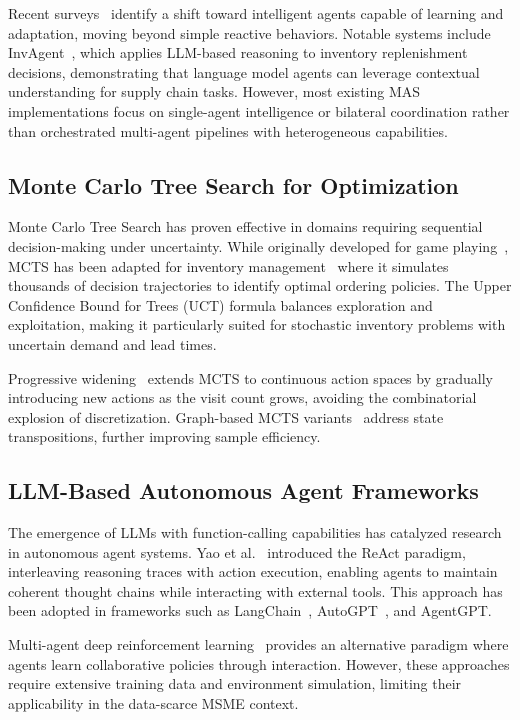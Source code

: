 \documentclass[conference]{IEEEtran}
\begin{document}
Recent surveys~\cite{mas_evolution} identify a shift toward intelligent agents capable of learning and adaptation, moving beyond simple reactive behaviors. Notable systems include InvAgent~\cite{invagent2024}, which applies LLM-based reasoning to inventory replenishment decisions, demonstrating that language model agents can leverage contextual understanding for supply chain tasks. However, most existing MAS implementations focus on single-agent intelligence or bilateral coordination rather than orchestrated multi-agent pipelines with heterogeneous capabilities.

\subsection{Monte Carlo Tree Search for Optimization}

Monte Carlo Tree Search has proven effective in domains requiring sequential decision-making under uncertainty. While originally developed for game playing~\cite{mcts_survey}, MCTS has been adapted for inventory management~\cite{mcts_inventory} where it simulates thousands of decision trajectories to identify optimal ordering policies. The Upper Confidence Bound for Trees (UCT) formula balances exploration and exploitation, making it particularly suited for stochastic inventory problems with uncertain demand and lead times.

Progressive widening~\cite{mcts_progressive} extends MCTS to continuous action spaces by gradually introducing new actions as the visit count grows, avoiding the combinatorial explosion of discretization. Graph-based MCTS variants~\cite{mcts_graph_search} address state transpositions, further improving sample efficiency.

\subsection{LLM-Based Autonomous Agent Frameworks}

The emergence of LLMs with function-calling capabilities has catalyzed research in autonomous agent systems. Yao et al.~\cite{yao2023react} introduced the ReAct paradigm, interleaving reasoning traces with action execution, enabling agents to maintain coherent thought chains while interacting with external tools. This approach has been adopted in frameworks such as LangChain~\cite{langchain2023}, AutoGPT~\cite{autogpt2023}, and AgentGPT.

Multi-agent deep reinforcement learning~\cite{madrl_survey} provides an alternative paradigm where agents learn collaborative policies through interaction. However, these approaches require extensive training data and environment simulation, limiting their applicability in the data-scarce MSME context.
\end{document}
